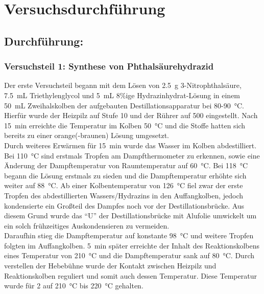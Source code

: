 \section{Versuchsdurchführung}
\label{sec:durchfuerung}

\vspace*{-7mm}
\vspace*{-7mm}

\subsection*{Durchführung:}
\subsubsection*{Versuchsteil 1: Synthese von Phthalsäurehydrazid}
Der erste Versuchsteil begann mit dem Lösen von \SI{2,5}{\gram} 3-Nitrophthalsäure, \SI{7,5}{\milli \liter} Triethylenglycol und \SI{5}{\milli \liter} 8\%ige Hydrazinhydrat-Lösung in einem \SI{50}{\milli \liter} Zweihalskolben der aufgebauten Destillationsapparatur bei 80-\SI{90}{\celsius}. Hierfür wurde der Heizpilz auf Stufe 10 und der Rührer auf \SI{500}{\rpm} eingestellt. Nach \SI{15}{\minute} erreichte die Temperatur im Kolben \SI{50}{\celsius} und die Stoffe hatten sich bereits zu einer orange(-braunen) Lösung umgesetzt.\\
Durch weiteres Erwärmen für \SI{15}{\minute} wurde das Wasser im Kolben abdestilliert. Bei \SI{110}{\celsius} sind erstmals Tropfen am Dampfthermometer zu erkennen, sowie eine Änderung der Dampftemperatur von Raumtemperatur auf \SI{60}{\celsius}.  Bei \SI{118}{\celsius} begann die Lösung erstmals zu sieden und die Dampftemperatur erhöhte sich weiter auf \SI{88}{\celsius}. Ab einer Kolbentemperatur von \SI{126}{\celsius} fiel zwar der erste Tropfen des abdestillierten Wassers/Hydrazins in den Auffangkolben, jedoch kondensierte ein Großteil des Dampfes noch vor der Destillationsbrücke. Aus diesem Grund wurde das "`U"' der Destillationsbrücke mit Alufolie umwickelt um ein solch frühzeitiges Auskondensieren zu vermeiden.\\
Daraufhin stieg die Dampftemperatur auf konstante \SI{98}{\celsius} und weitere Tropfen folgten im Auffangkolben. \SI{5}{\minute} später erreichte der Inhalt des Reaktionskolbens eines Temperatur von \SI{210}{\celsius} und die Dampftemperatur sank auf \SI{80}{\celsius}. Durch verstellen der Hebebühne wurde der Kontakt zwischen Heizpilz und Reaktionskolben reguliert und somit auch dessen Temperatur. Diese Temperatur wurde für \SI{2}{\min} auf \SI{210}{\celsius} bis \SI{220}{\celsius} gehalten.\\
